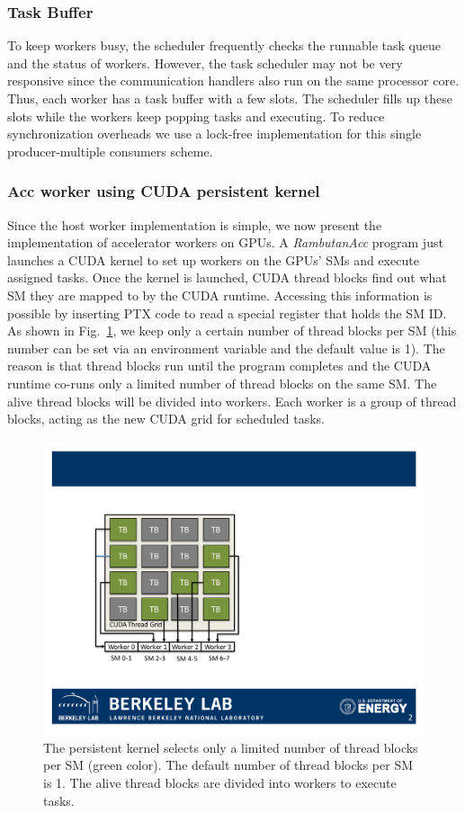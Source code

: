 \subsubsection{Task Buffer}
To keep workers busy, the scheduler frequently checks the runnable task queue and the status of workers.
However, the task scheduler may not be very responsive since the communication handlers also run on the same processor core.
Thus, each worker has a task buffer with a few slots.
The scheduler fills up these slots while the workers keep popping tasks and executing.
To reduce synchronization overheads we use a lock-free implementation for this single producer-multiple consumers scheme.

\subsubsection{Acc worker using CUDA persistent kernel}
Since the host worker implementation is simple, we now present the implementation of accelerator workers on GPUs.
A {\em RambutanAcc} program just launches a CUDA kernel to set up workers on the GPUs' SMs and execute assigned tasks.
Once the kernel is launched, CUDA thread blocks find out what SM they are mapped to by the CUDA runtime.
Accessing this information is possible by inserting PTX code to read a special register that holds the SM ID.
As shown in Fig.~\ref{fig:kernel}, we keep only a certain number of thread blocks per SM (this number can be set via an environment variable and the default value is 1).
The reason is that thread blocks run until the program completes and the CUDA runtime co-runs only a limited number of thread blocks on the same SM.
The alive thread blocks will be divided into workers.
Each worker is a group of thread blocks, acting as the new CUDA grid for scheduled tasks.

\begin{figure}[htb]
\centering
\includegraphics[width=.35\textwidth]{figures/kernel_init.pdf}
\caption{The persistent kernel selects only a limited number of thread blocks per SM (green color). The default number of thread blocks per SM is 1. 
The alive thread blocks are divided into workers to execute tasks.}
\label{fig:kernel}
\end{figure}

